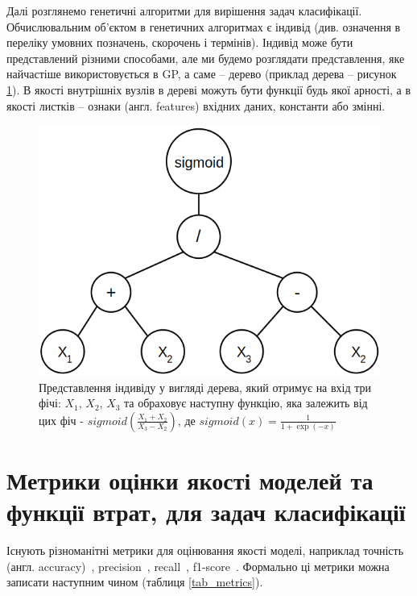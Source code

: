Далі розглянемо генетичні алгоритми для вирішення задач класифікації. Обчислювальним об'єктом в генетичних алгоритмах є індивід (див. означення в переліку умовних позначень, скорочень і термінів). Індивід може бути представлений різними способами, але ми будемо розглядати представлення, яке найчастіше використовується в GP, а саме -- дерево (приклад дерева -- рисунок \ref{fig_genotype}). В якості внутрішніх вузлів в дереві можуть бути функції будь якої арності, а в якості листків -- ознаки (англ. features) вхідних даних, константи або змінні. 

\begin{figure}[ht]
	\centering
	\includegraphics[scale=0.5]{Images/genotype_example.png}
	\caption{Представлення індивіду у вигляді дерева, який отримує на вхід три фічі: $X_1$, $X_2$, $X_3$ та обраховує наступну функцію, яка залежить від цих фіч - $sigmoid\left(\frac{X_1 + X_2}{X_3 - X_2}\right)$, де $sigmoid(x) = \frac{1}{1 + \exp(-x)}$}
	\label{fig_genotype}
\end{figure}

\section{Метрики оцінки якості моделей та функції втрат, для задач класифікації}


Існують різноманітні метрики для оцінювання якості моделі, наприклад точність (англ. accuracy)~\cite{ct6}, precision~\cite{ct6}, recall~\cite{ct7}, f1-score~\cite{ct8}. Формально ці метрики можна записати наступним чином (таблиця \ref{tab_metrics}).

